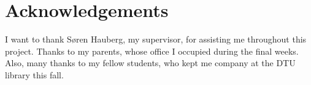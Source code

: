 \section*{Acknowledgements}

I want to thank Søren Hauberg, my supervisor, for assisting me throughout this project. Thanks to my parents, whose office I occupied during the final weeks. Also, many thanks to my fellow students, who kept me company at the DTU library this fall. 